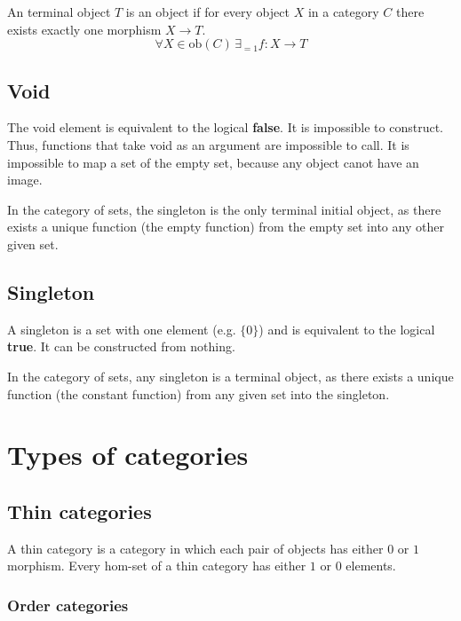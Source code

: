 \documentclass{article}
\begin{document}
An terminal object \(T\) is an object if
for every object \(X\) in a category \(C\)
there exists exactly one morphism \(X\to T\).
\[
    \forall X\in \text{ob}(C) \,\exists_{=1}f:X\to T
\]

\subsection{Void}

The void element is equivalent to the logical \textbf{false}.
It is impossible to construct. Thus, functions that take void
as an argument are impossible to call.
It is impossible to map a set of the empty set, because
any object canot have an image.

In the category of sets, the singleton is the only terminal initial object,
as there exists a unique function (the empty function) from the empty set
into any other given set.

\subsection{Singleton}

A singleton is a set with one element (e.g. \(\{0\}\)) and
is equivalent to the logical \textbf{true}.
It can be constructed from nothing.

In the category of sets, any singleton is a terminal object,
as there exists a unique function (the constant function) from any given
set into the singleton.


\pagebreak

\section{Types of categories}

\subsection{Thin categories}

A thin category is a category in which each pair of objects
has either \(0\) or \(1\) morphism.
Every hom-set of a thin category has either \(1\) or \(0\) elements.

\subsubsection{Order categories}
\end{document}
